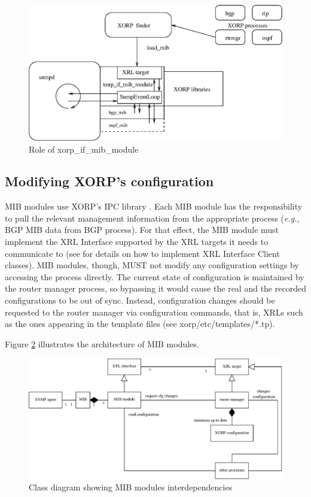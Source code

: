 \documentclass[11pt]{article}
\newcommand{\eg}{\emph{e.g.,}\xspace}
\begin{document}
\begin{figure}
  \begin{center}
    \includegraphics[width=1\textwidth]{figs/snmp_fig2}
  \end{center}
  \caption{Role of xorp\_if\_mib\_module}
  \label{fig:xorp-if-diag}
\end{figure}




\subsection{Modifying XORP's configuration}


MIB modules use XORP's IPC library \cite{xorp:xrl}.  Each MIB module has the
responsibility to pull the relevant management information from the appropriate
process (\eg BGP MIB data from BGP process).  For that effect, the MIB module
must implement the XRL Interface supported by the XRL targets it needs to
communicate to (see \cite{xorp:xrl_interfaces} for details on how to implement
XRL Interface Client classes).  MIB modules, though, MUST not modify any
configuration settings by accessing the process directly.  The current state of
configuration is maintained by the router manager process, so bypassing it would
cause the real and the recorded configurations to be out of sync.  Instead,
configuration changes should be requested to the router manager via
configuration commands, that is, XRLs such as the ones appearing in the template
files (see xorp/etc/templates/*.tp).

Figure \ref{fig:mib-class-diag} illustrates the architecture of MIB modules.
\begin{figure}
  \begin{center}
    \includegraphics[width=1\textwidth]{figs/snmp_fig1}
  \end{center}
  \caption{Class diagram showing MIB modules interdependencies}
  \label{fig:mib-class-diag}
\end{figure}
\end{document}
